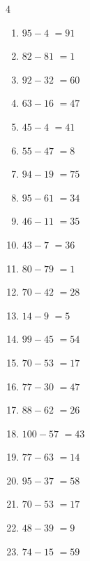 \begin{multicols}{4}
\begin{enumerate}
  \item $95-4$
        $=91$

  \item $82-81$
        $=1$

  \item $92-32$
        $=60$

  \item $63-16$
        $=47$

  \item $45-4$
        $=41$

  \item $55-47$
        $=8$

  \item $94-19$
        $=75$

  \item $95-61$
        $=34$

  \item $46-11$
        $=35$

  \item $43-7$
        $=36$

  \item $80-79$
        $=1$

  \item $70-42$
        $=28$

  \item $14-9$
        $=5$

  \item $99-45$
        $=54$

  \item $70-53$
        $=17$

  \item $77-30$
        $=47$

\columnbreak %

  \item $88-62$
        $=26$

  \item $100-57$
        $=43$

  \item $77-63$
        $=14$

  \item $95-37$
        $=58$

  \item $70-53$
        $=17$

  \item $48-39$
        $=9$

  \item $74-15$
        $=59$


\end{enumerate}
\end{multicols}
